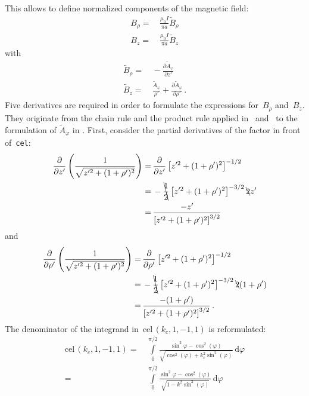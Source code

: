This allows to define normalized components of the magnetic field:
\begin{align}
  B_\rho =&\, \frac{\mu_0 I}{\pi a} \tilde{B}_\rho \\
  B_z    =&\, \frac{\mu_0 I}{\pi a} \tilde{B}_z
\end{align}
with
\begin{align}
  \tilde{B}_\rho =&\, - \frac{\partial \tilde{A}_\varphi}{\partial z'}                                    \label{eqn:cwl_norm_B_rho} \\
  \tilde{B}_z    =&\, \frac{\tilde{A}_\varphi}{\rho'} + \frac{\partial \tilde{A}_\varphi}{\partial \rho'} \label{eqn:cwl_norm_B_z}   \, .
\end{align}
Five derivatives are required in order to formulate the expressions for~$B_\rho$ and~$B_z$.
They originate from the chain rule and the product rule applied in~ and~
to the formulation of $\tilde{A}_\varphi$ in .
First, consider the partial derivatives of the factor in front of~\texttt{cel}:
\begin{align}
      \frac{\partial}{\partial z'} \left( \frac{1}{\sqrt{z'^2 + (1 + \rho')^2}} \right)
 =&\, \frac{\partial}{\partial z'} \left[ z'^2 + (1 + \rho')^2 \right]^{-1/2} \nonumber \\
 =&\, - \bcancel{\frac{1}{2}} \left[ z'^2 + (1 + \rho')^2 \right]^{-3/2} \bcancel{2} z' \nonumber \\
 =&\, \frac{- z'}{\left[ z'^2 + (1 + \rho')^2 \right]^{3/2} }
\end{align}
and
\begin{align}
      \frac{\partial}{\partial \rho'} \left( \frac{1}{\sqrt{z'^2 + (1 + \rho')^2}} \right)
 =&\, \frac{\partial}{\partial \rho'} \left[ z'^2 + (1 + \rho')^2 \right]^{-1/2} \nonumber \\
 =&\, - \bcancel{\frac{1}{2}} \left[ z'^2 + (1 + \rho')^2 \right]^{-3/2} \bcancel{2} (1 + \rho') \nonumber \\
 =&\, \frac{- (1 + \rho')}{\left[ z'^2 + (1 + \rho')^2 \right]^{3/2} } \, .
\end{align}
The denominator of the integrand in~$\textrm{cel}\,(k_c, 1, -1, 1)$ is reformulated:
\begin{align}
  \textrm{cel}\,(k_c, 1, -1, 1)
 =&\, \int\limits_0^{\pi/2} \frac{\sin^2{\varphi} - \cos^2(\varphi)}{\sqrt{\cos^2(\varphi) + k_c^2 \sin^2(\varphi)}} \,\mathrm{d}\varphi \nonumber \\
 =&\, \int\limits_0^{\pi/2} \frac{\sin^2{\varphi} - \cos^2(\varphi)}{\sqrt{1 - k^2 \sin^2(\varphi)}} \,\mathrm{d}\varphi
\end{align}

